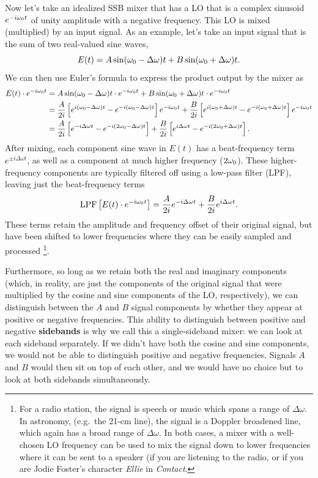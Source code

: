 \documentclass[11pt,preprint]{aastex}
\begin{document}
Now let's take an idealized SSB mixer that has a LO that
is a complex sinusoid $e^{-i\omega_0 t}$ of unity amplitude with a negative frequency.  
This LO is mixed (multiplied) by an input signal. As an example, let's take an input signal
that is the sum of two real-valued sine waves,
\begin{equation}
E(t)=A\sin (\omega_0-\Delta\omega)t + B \sin (\omega_0+\Delta\omega)t.
\end{equation}
We can then use Euler's formula to express the product output by the mixer as
\begin{align}
E(t)\cdot e^{-i\omega_0 t} &= A\sin (\omega_0-\Delta\omega)t\cdot e^{-i\omega_0 t} + B \sin (\omega_0+\Delta\omega)t \cdot e^{-i\omega_0 t}\\
&= \frac{A}{2i}\left[e^{i(\omega_0-\Delta\omega)t}-e^{-i(\omega_0-\Delta\omega)t}\right]e^{-i\omega_0 t} +
  \frac{B}{2i}\left[e^{i(\omega_0+\Delta\omega)t}-e^{-i(\omega_0+\Delta\omega)t}\right]e^{-i\omega_0 t}\\
&= \frac{A}{2i}\left[e^{-i\Delta\omega t}-e^{-i(2\omega_0-\Delta\omega)t}\right] +
  \frac{B}{2i}\left[e^{i\Delta\omega t}-e^{-i(2\omega_0+\Delta\omega)t}\right].
\end{align}
After mixing, each component sine wave in $E(t)$ has a beat-frequency term
$e^{\pm i \Delta\omega t}$, as well as a component at much higher frequency ($2\omega_0$).
These higher-frequency components are typically filtered off using a low-pass filter (LPF), leaving just the
beat-frequency terms
\begin{equation}
{\rm LPF}\left[E(t)\cdot e^{-i\omega_0 t}\right] =
  \frac{A}{2i}e^{-i\Delta\omega t} + \frac{B}{2i} e^{i\Delta\omega t}.
\end{equation}
These terms retain the amplitude and frequency offset of their original signal, but have been shifted 
to lower frequencies where they can be easily sampled and processed%
\footnote{For a radio station, the signal is
speech or music which spans a range of $\Delta\omega$. In astronomy,
(e.g.\ the 21-cm line), the signal is a Doppler broadened line, which
again has a broad range of $\Delta\omega$.  In both cases, a mixer with a well-chosen
LO frequency can be used to mix the signal down to lower frequencies where it can
be sent to a speaker (if you are listening to the radio, or if you are Jodie Foster's
character {\it Ellie} in {\it Contact}.}.

Furthermore, so long as we retain both the real and imaginary components (which,
in reality, are just the components of the original signal that were multiplied by 
the cosine and sine components of the LO, respectively), we can distinguish 
between the $A$ and $B$ signal components by whether they appear at positive or negative
frequencies.  This ability to distinguish between positive and negative {\bf sidebands}
is why we call this a single-sideband mixer: we can look at each sideband separately.
If we didn't have both the cosine and sine components, we would not be able to distinguish
positive and negative frequencies. Signals $A$ and $B$ would then sit on top
of each other, and we would have no choice but to look at both sidebands simultaneously.
\end{document}
